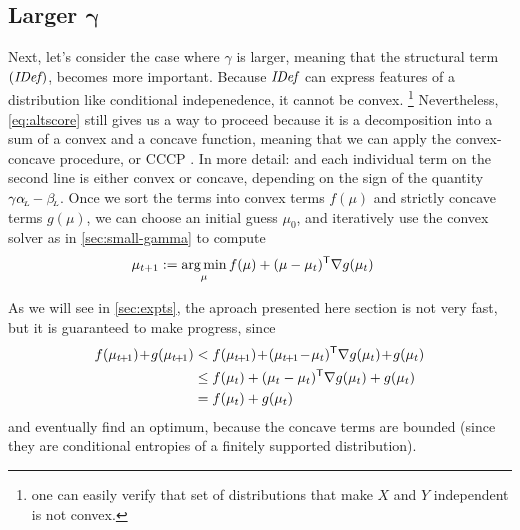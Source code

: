 \documentclass[twoside]{article}
\begin{document}
\subsection{Larger 
    \texorpdfstring{$\boldsymbol\gamma$}{gamma}}
    \label{sec:larger-gamma}

Next, let's consider the case where $\gamma$ is 
larger, meaning that the structural term $(\mathit{IDef}_{\!})$, 
becomes more important.
Because $\mathit{IDef}_{\!}$ can express features of a distribution like conditional indepenedence,
it cannot be convex.%
    \footnote{one can easily verify that set of distributions that make $X$ and $Y$ independent is not convex.}
Nevertheless, \eqref{eq:altscore} still gives us a way to proceed because it is a decomposition into a sum of a convex and a concave function, meaning that we can apply the convex-concave procedure, or CCCP \parencite{yuille2003concave}. 
In more detail: and each individual term on the second line is either convex or concave, depending on the sign of the quantity $\gamma \alpha_{\!_{L}\!} - \beta_{\!_{L}\!}$. 
Once we sort the terms into convex terms $f(\mu)$ and strictly concave terms $g(\mu)$, we can choose an initial guess $\mu_0$, and iteratively use the convex solver as in \cref{sec:small-gamma} to compute
%
\begin{align*}
    \mu_{t+1} &:= \operatorname*{arg\,min}_{\mu} f(\mu) + (\mu - \mu_{t})^{\sf T}
        \nabla g(\mu_t)
\end{align*}

As we will see in \cref{sec:expts}, the aproach presented here section is 
not very fast, but it is guaranteed to make progress, since
\def\tplus1{{t\mskip-2mu+\mskip-2mu1}}
\begin{align*}
    f(\mu_\tplus1) \!+\! g(\mu_\tplus1) &<  f(\mu_\tplus1) \!+\! (\mu_\tplus1 \!-\! \mu_t)^{\sf T} \nabla g(\mu_t) \!+\! g(\mu_t)
        \\
    &\le  f(\mu_t) + (\mu_t - \mu_{t})^{\sf T}\nabla g(\mu_t)  + g(\mu_t)
    \\
&= f(\mu_t) + g(\mu_t)
\end{align*}
and eventually find an optimum, because the concave terms are bounded (since they are conditional entropies of a finitely supported distribution).


\end{document}
